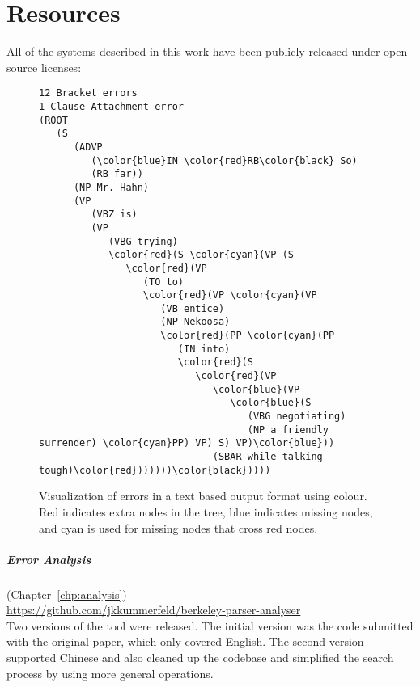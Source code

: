 \chapter{Resources} \label{chp:resources}

All of the systems described in this work have been publicly released under open source licenses:

\begin{figure}
{\footnotesize
  \begin{Verbatim}[commandchars=\\\{\},codes={\catcode`$=3\catcode`^=7\catcode`_=8}]
12 Bracket errors
1 Clause Attachment error
(ROOT
   (S
      (ADVP
         (\color{blue}IN \color{red}RB\color{black} So)
         (RB far))
      (NP Mr. Hahn)
      (VP
         (VBZ is)
         (VP
            (VBG trying)
            \color{red}(S \color{cyan}(VP (S
               \color{red}(VP
                  (TO to)
                  \color{red}(VP \color{cyan}(VP
                     (VB entice)
                     (NP Nekoosa)
                     \color{red}(PP \color{cyan}(PP
                        (IN into)
                        \color{red}(S
                           \color{red}(VP
                              \color{blue}(VP
                                 \color{blue}(S
                                    (VBG negotiating)
                                    (NP a friendly surrender) \color{cyan}PP) VP) S) VP)\color{blue}))
                              (SBAR while talking tough)\color{red}))))))\color{black}))))
\end{Verbatim}
}
\caption[Parse error visualization example.]{ \label{fig:error-vis}
  Visualization of errors in a text based output format using colour.
  Red indicates extra nodes in the tree, blue indicates missing nodes, and cyan is used for missing nodes that cross red nodes.
}
\end{figure}

\paragraph{Error Analysis} (Chapter~\ref{chp:analysis}) \\
\url{https://github.com/jkkummerfeld/berkeley-parser-analyser} \\
Two versions of the tool were released.
The initial version was the code submitted with the original paper, which only covered English.
The second version supported Chinese and also cleaned up the codebase and simplified the search process by using more general operations.


